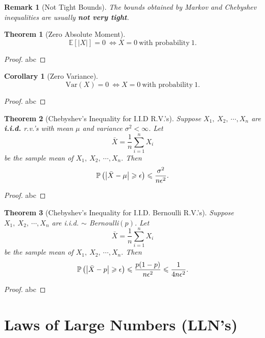 \documentclass[openany,12pt]{book}
\newtheorem{theorem}{Theorem}[chapter]
\newtheorem{corollary}{Corollary}[chapter]
\newtheorem{remark}{Remark}[chapter]
\begin{document}
\begin{remark}[Not Tight Bounds]
The bounds obtained by Markov and Chebyshev inequalities are usually
\textbf{not very tight}.\\
\vspace{0.01cm}
\end{remark}

\begin{theorem}[Zero Absolute Moment]
\[\mathbb{E}[\left| X \right|] = 0\  \Leftrightarrow X = 0\ \mathrm{\text{with\ probability}}\ 1.\]
\end{theorem}

\begin{proof}
  abc
\end{proof}

\begin{corollary}[Zero Variance]
\[\mathrm{Var}(X) = 0\  \Leftrightarrow X = 0\ \mathrm{\text{with\ probability}}\ 1.\]
\end{corollary}

\begin{proof}
  abc
\end{proof}

\begin{theorem}[Chebyshev's Inequality for I.I.D R.V.'s]
Suppose $X_{1},\ X_{2},\ \cdots,X_{n}$ are \textbf{i.i.d.} r.v.'s with
mean $\mu$ and variance $\sigma^{2} < \infty$. Let 
\[\bar{X} = \frac{1}{n}\sum_{i = 1}^{n}X_{i}\]
be the sample mean of $ X_{1},\ X_{2},\ \cdots,X_{n}.$
Then
\[\mathbb{P}\left( \left| \bar{X} - \mu \right| \geqslant \epsilon \right) \leqslant \frac{\sigma^{2}}{n\epsilon^{2}}.\]
\end{theorem}

\begin{proof}
  abc
\end{proof}

\begin{theorem}[Chebyshev's Inequality for I.I.D. Bernoulli R.V.'s]
Suppose $X_{1},\ X_{2},\ \cdots,X_{n}$ are i.i.d. $\sim$ Bernoulli$(p)$. Let 
\[\bar{X} = \frac{1}{n}\sum_{i = 1}^{n}X_{i}\]
be the sample mean of $ X_{1},\ X_{2},\ \cdots,X_{n}.$
Then
\[\mathbb{P}\left( \left| \bar{X} - p \right| \geqslant \epsilon \right) \leqslant \frac{p(1 - p)}{n\epsilon^{2}} \leqslant \frac{1}{4n\epsilon^{2}}.\]
\end{theorem}

\begin{proof}
  abc
\end{proof}

\section{Laws of Large Numbers (LLN's)}
\end{document}
